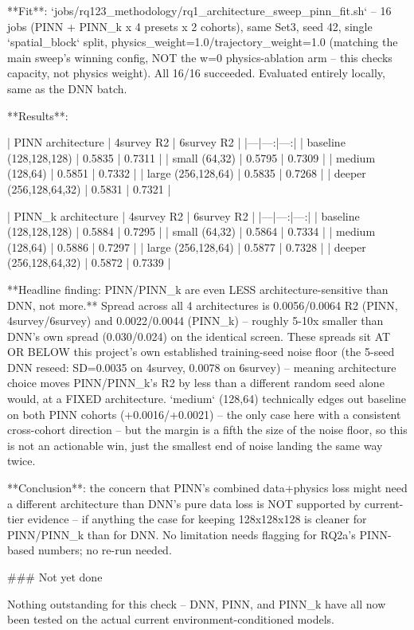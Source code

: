 **Fit**: `jobs/rq123_methodology/rq1_architecture_sweep_pinn_fit.sh` -- 16 jobs (PINN +
PINN_k x 4 presets x 2 cohorts), same Set3, seed 42, single `spatial_block` split,
physics_weight=1.0/trajectory_weight=1.0 (matching the main sweep's winning config, NOT the w=0
physics-ablation arm -- this checks capacity, not physics weight). All 16/16 succeeded. Evaluated
entirely locally, same as the DNN batch.

**Results**:

| PINN architecture | 4survey R2 | 6survey R2 |
|---|---:|---:|
| baseline (128,128,128) | 0.5835 | 0.7311 |
| small (64,32) | 0.5795 | 0.7309 |
| medium (128,64) | 0.5851 | 0.7332 |
| large (256,128,64) | 0.5835 | 0.7268 |
| deeper (256,128,64,32) | 0.5831 | 0.7321 |

| PINN_k architecture | 4survey R2 | 6survey R2 |
|---|---:|---:|
| baseline (128,128,128) | 0.5884 | 0.7295 |
| small (64,32) | 0.5864 | 0.7334 |
| medium (128,64) | 0.5886 | 0.7297 |
| large (256,128,64) | 0.5877 | 0.7328 |
| deeper (256,128,64,32) | 0.5872 | 0.7339 |

**Headline finding: PINN/PINN_k are even LESS architecture-sensitive than DNN, not more.** Spread
across all 4 architectures is 0.0056/0.0064 R2 (PINN, 4survey/6survey) and 0.0022/0.0044 (PINN_k)
-- roughly 5-10x smaller than DNN's own spread (0.030/0.024) on the identical screen. These spreads
sit AT OR BELOW this project's own established training-seed noise floor (the 5-seed DNN reseed:
SD=0.0035 on 4survey, 0.0078 on 6survey) -- meaning architecture choice moves PINN/PINN_k's R2 by
less than a different random seed alone would, at a FIXED architecture. `medium` (128,64)
technically edges out baseline on both PINN cohorts (+0.0016/+0.0021) -- the only case here with a
consistent cross-cohort direction -- but the margin is a fifth the size of the noise floor, so this
is not an actionable win, just the smallest end of noise landing the same way twice.

**Conclusion**: the concern that PINN's combined data+physics loss might need a different
architecture than DNN's pure data loss is NOT supported by current-tier evidence -- if anything the
case for keeping 128x128x128 is cleaner for PINN/PINN_k than for DNN. No limitation needs flagging
for RQ2a's PINN-based numbers; no re-run needed.

### Not yet done

Nothing outstanding for this check -- DNN, PINN, and PINN_k have all now been tested on the actual
current environment-conditioned models.
